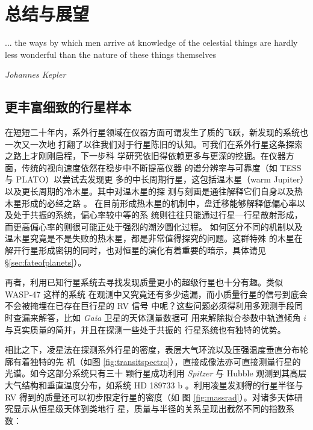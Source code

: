 \chapter{总结与展望} \label{chapter:conclusion}

\epigraph{... the ways by which men arrive at knowledge of the celestial things are hardly less wonderful than the nature of these things themselves}{\textit{Johannes Kepler}}


\section{更丰富细致的行星样本}

在短短二十年内，系外行星领域在仪器方面可谓发生了质的飞跃，新发现的系统也一次又一次地
打翻了以往我们对于行星陈旧的认知。可我们在系外行星这条探索之路上才刚刚启程，下一步科
学研究依旧得依赖更多与更深的挖掘。在仪器方面，传统的视向速度依然在稳步中不断提高仪器
的谱分辨率与可靠度（如 TESS\cite{Ricker2015} 与 PLATO\cite{Rauer2014}）以尝试去发现更
多的中长周期行星，这包括温木星（warm Jupiter）以及更长周期的冷木星。其中对温木星的探
测与刻画是通往解释它们自身以及热木星形成的必经之路
\cite{Petrovich2016,Huang2016,Dong2014a,Frewen2016,Dawson2014a,Antonini2016}。
在目前形成热木星的机制中，盘迁移能够解释低偏心率以及处于共振的系统，偏心率较中等的系
统则往往只能通过行星---行星散射形成，而更高偏心率的则很可能正处于强烈的潮汐圆化过程。
如何区分不同的机制以及温木星究竟是不是失败的热木星，都是非常值得探究的问题。这群特殊
的木星在解开行星形成密钥的同时，也对恒星的演化有着重要的暗示，具体请见 \S \ref{sec:fateofplanets}）。

再者，利用已知行星系统去寻找发现质量更小的超级行星也十分有趣。类似 WASP-47 这样的系统
在观测中又究竟还有多少遗漏，而小质量行星的信号到底会不会被掩埋在已存在巨行星的 RV 信号
中呢？这些问题必须得利用多观测手段同时查漏来解答，比如 \textit{Gaia} 卫星的天体测量数据可
用来解除拟合参数中轨道倾角 $i$ 与真实质量的简并\cite{Gaia2016}，并且在探测一些处于共振的
行星系统也有独特的优势\cite{Wu2016}。

相比之下，凌星法在探测系外行星的密度，表层大气环流以及压强温度垂直分布轮廓有着独特的先
机（如图 \ref{fig:transitspectro}），直接成像法亦可直接测量行星的光谱。如今这部分系统只有三十
颗行星成功利用 \textit{Spitzer} 与 Hubble 观测到其高层大气结构和垂直温度分布，如系统 HD 189733 b
\cite{Knutson2007}。利用凌星发测得的行星半径与 RV 得到的质量还可以初步限定行星的密度（如
图 \ref{fig:massrad}）。对诸多天体研究\cite{Baraffe2008,Fortney2007}显示从恒星级天体到类地行
星，质量与半径的关系呈现出截然不同的指数系数：


